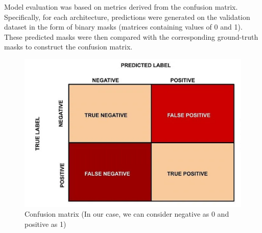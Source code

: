 Model evaluation was based on metrics derived from the confusion matrix. Specifically, for each architecture, predictions were generated on the validation dataset in the form of binary masks (matrices containing values of 0 and 1). These predicted masks were then compared with the corresponding ground-truth masks to construct the confusion matrix.\\

\begin{figure}[H]
 \centering
 \includegraphics[scale=0.8]{IMAGENES/IMG16-CM.PNG}
 \captionsetup{font=large}
 \caption {Confusion matrix (In our case, we can consider negative as 0 and positive as 1)}
\end{figure}


